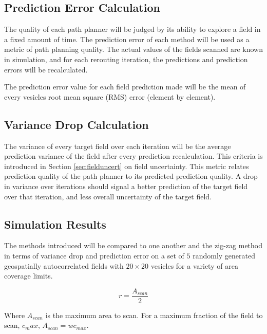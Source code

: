 \subsection{Prediction Error Calculation}
The quality of each path planner will be judged by its ability to explore a field in a fixed amount of time. The prediction error of each method will be used as a metric of path planning quality. The actual values of the fields scanned are known in simulation, and for each rerouting iteration, the predictions and prediction errors will be recalculated.

The prediction error value for each field prediction made will be the mean of every vesicles root mean square (RMS) error (element by element).

\subsection{Variance Drop Calculation}
The variance of every target field over each iteration will be the average prediction variance of the field after every prediction recalculation. This criteria is introduced in Section \ref{sec:fielduncert} on field uncertainty. This metric relates prediction quality of the path planner to its predicted prediction quality. A drop in variance over iterations should signal a better prediction of the target field over that iteration, and less overall uncertainty of the target field.

\subsection{Simulation Results}
The methods introduced will be compared to one another and the zig-zag method in terms of variance drop and prediction error on a set of $5$ randomly generated geospatially autocorrelated fields with $20\times20$ vesicles for a variety of area coverage limits.

\begin{equation}
	r = \frac{A_{scan}}{2}
\end{equation}

Where $A_{scan}$ is the maximum area to scan. For a maximum fraction of the field to scan, $c_max$, $A_{scan} = wc_{max}$.

